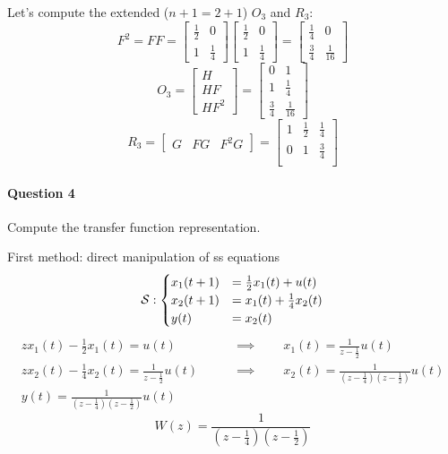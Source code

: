 \begin{example}
    Let's compute the extended ($n+1 = 2+1$) $O_3$ and $R_3$:
    \[
        F^{2} = F F = 
        \begin{bmatrix}
            \frac{1}{2} & 0 \\
            1 & \frac{1}{4} 
        \end{bmatrix} 
        \begin{bmatrix}
            \frac{1}{2} & 0 \\
            1 & \frac{1}{4} 
        \end{bmatrix} = 
        \begin{bmatrix}
            \frac{1}{4} & 0 \\
            \frac{3}{4} & \frac{1}{16} 
        \end{bmatrix}
    \]
    \[
        O_3 = \begin{bmatrix}
            H \\ HF \\ HF^2
        \end{bmatrix} = \begin{bmatrix}
            0 & 1 \\
            1 & \frac{1}{4} \\
            \frac{3}{4} & \frac{1}{16}
        \end{bmatrix}
    \]
    \[
        R_3 = \begin{bmatrix}
            G & FG & F^2G
        \end{bmatrix} = \begin{bmatrix}
            1 & \frac{1}{2} & \frac{1}{4} \\
            0 & 1 & \frac{3}{4} \\
        \end{bmatrix}
    \]

    \paragraph{Question 4} Compute the transfer function representation.

    First method: direct manipulation of \gls{ss} equations
    \[
        \mathcal{S}:
        \begin{cases}
            x_1(t+1) &= \frac{1}{2}x_1(t) + u(t) \\
            x_2(t+1) &= x_1(t) + \frac{1}{4}x_2(t) \\
            y(t) &= x_2(t)
        \end{cases}
    \]
    \begin{align*}
        zx_1(t) - \frac{1}{2}x_1(t) = u(t) \qquad &\implies \qquad x_1(t) = \frac{1}{z-\frac{1}{2}}u(t) \\
        zx_2(t) - \frac{1}{4}x_2(t) = \frac{1}{z-\frac{1}{2}}u(t) \qquad &\implies \qquad x_2(t) = \frac{1}{(z-\frac{1}{4})(z-\frac{1}{2})}u(t) \\
        y(t) = \frac{1}{(z-\frac{1}{4})(z-\frac{1}{2})}u(t)
    \end{align*}
    \[
        W(z) = \frac{1}{(z-\frac{1}{4})(z-\frac{1}{2})}
    \]


\end{example}

